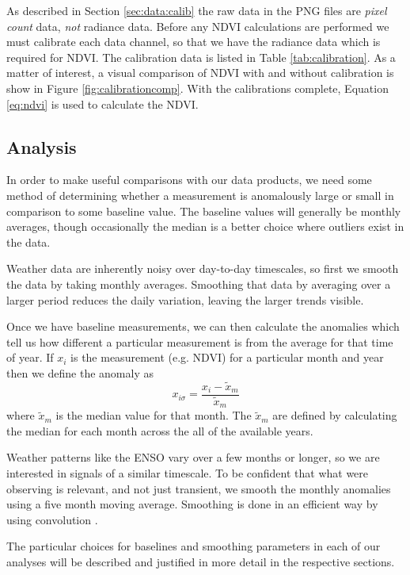 As described in Section \ref{sec:data:calib} the raw data in the PNG files are
\emph{pixel count} data, \emph{not} radiance data. Before any NDVI calculations
are performed we must calibrate each data channel, so that we have the radiance
data which is required for NDVI. The calibration data is listed in Table
\ref{tab:calibration}. As a matter of interest, a visual comparison of NDVI with
and without calibration is show in Figure \ref{fig:calibrationcomp}. With the
calibrations complete, Equation \eqref{eq:ndvi} is used to calculate the NDVI.

\subsection{Analysis}
\label{sec:analysis}
In order to make useful comparisons with our data products, we need some method
of determining whether a measurement is anomalously large or small in comparison
to some baseline value. The baseline values will generally be monthly averages,
though occasionally the median is a better choice where outliers exist in the
data.

Weather data are inherently noisy over day-to-day timescales, so first we smooth
the data by taking monthly averages. Smoothing that data by averaging over a
larger period reduces the daily variation, leaving the larger trends visible.

Once we have baseline measurements, we can then calculate the anomalies which
tell us how different a particular measurement is from the average for that time
of year. If $x_{i}$ is the measurement (e.g. NDVI) for a particular month and
year then we define the anomaly as
\begin{equation}
  x_{i\sigma}=\frac{x_{i}-\tilde{x}_m}{\tilde{x}_m}
  \label{eq:anoms}
\end{equation}
where $\tilde{x}_m$ is the median value for that month. The $\tilde{x}_m$ are
defined by calculating the median for each month across the all of the available
years.

Weather patterns like the ENSO vary over a few months or longer, so we are
interested in signals of a similar timescale. To be confident that what were
observing is relevant, and not just transient, we smooth the monthly anomalies
using a five month moving average. Smoothing is done in an efficient way by
using convolution \citep{gorry1990}.

The particular choices for baselines and smoothing parameters in each of our
analyses will be described and justified in more detail in the respective
sections.


